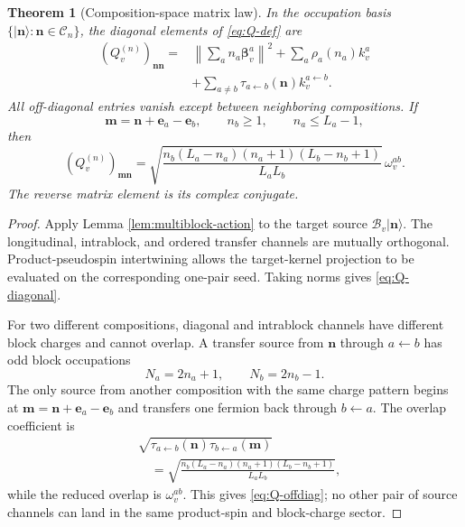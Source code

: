 \documentclass[11pt]{article}
\numberwithin{equation}{section}
\newtheorem{theorem}{Theorem}[section]
\newcommand{\cC}{\mathcal C}
\newcommand{\cB}{\mathcal B}
\newcommand{\bn}{\mathbf n}
\newcommand{\be}{\mathbf e}
\newcommand{\bbeta}{\boldsymbol\beta}
\begin{document}
\begin{theorem}[Composition-space matrix law]
\label{thm:composition-matrix}
In the occupation basis $\{|\bn\rangle:\bn\in\cC_n\}$, the diagonal elements of \eqref{eq:Q-def} are
\begin{align}
 (Q_v^{(n)})_{\bn\bn}
 ={}&\left\|\sum_an_a\bbeta_v^a\right\|^2
 +\sum_a\rho_a(n_a)k_v^a
 \nonumber\\
 &+\sum_{a\ne b}
 \tau_{a\leftarrow b}(\bn)k_v^{a\leftarrow b}.
 \label{eq:Q-diagonal}
\end{align}
All off-diagonal entries vanish except between neighboring compositions.  If
\begin{equation}
 \mathbf m=\bn+\be_a-\be_b,
 \qquad
 n_b\ge1,
 \qquad
 n_a\le L_a-1,
 \label{eq:neighbor-composition}
\end{equation}
then
\begin{equation}
 \boxed{
 (Q_v^{(n)})_{\mathbf m\bn}
 =\sqrt{
 \frac{
 n_b(L_a-n_a)(n_a+1)(L_b-n_b+1)
 }{L_aL_b}}
 \,\omega_v^{ab}.}
 \label{eq:Q-offdiag}
\end{equation}
The reverse matrix element is its complex conjugate.
\end{theorem}

\begin{proof}
Apply Lemma \ref{lem:multiblock-action} to the target source $\cB_v|\bn\rangle$.  The longitudinal, intrablock, and ordered transfer channels are mutually orthogonal.  Product-pseudospin intertwining allows the target-kernel projection to be evaluated on the corresponding one-pair seed.  Taking norms gives \eqref{eq:Q-diagonal}.

For two different compositions, diagonal and intrablock channels have different block charges and cannot overlap.  A transfer source from $\bn$ through $a\leftarrow b$ has odd block occupations
\begin{equation}
 N_a=2n_a+1,
 \qquad
 N_b=2n_b-1.
 \label{eq:odd-intermediate}
\end{equation}
The only source from another composition with the same charge pattern begins at $\mathbf m=\bn+\be_a-\be_b$ and transfers one fermion back through $b\leftarrow a$.  The overlap coefficient is
\begin{align}
 &\sqrt{
 \tau_{a\leftarrow b}(\bn)
 \tau_{b\leftarrow a}(\mathbf m)}
 \nonumber\\
 &\quad=
 \sqrt{
 \frac{
 n_b(L_a-n_a)(n_a+1)(L_b-n_b+1)
 }{L_aL_b}},
 \label{eq:clebsch-product}
\end{align}
while the reduced overlap is $\omega_v^{ab}$.  This gives \eqref{eq:Q-offdiag}; no other pair of source channels can land in the same product-spin and block-charge sector.
\end{proof}
\end{document}
